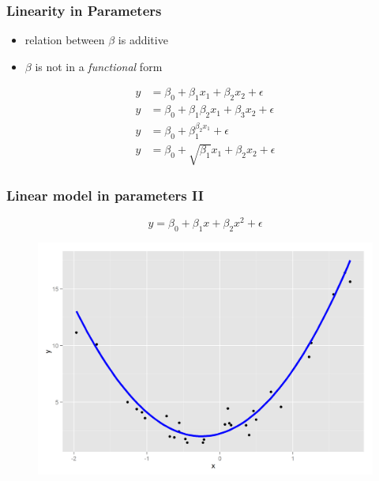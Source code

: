\documentclass[12pt]{beamer}\usepackage[]{graphicx}\usepackage[]{color}
\begin{document}

\begin{frame}
\frametitle{Linearity in Parameters}
\begin{Large}

 \begin{itemize}
	\item relation between $\beta$ is additive
	\item $\beta$ is not in a \emph{functional} form
 \end{itemize}
\begin{align}
y &= \beta_0 + \beta_1x_1 + \beta_2x_2 + \epsilon \\[0.4cm]
y &= \beta_0 + \beta_1\beta_2x_1 + \beta_3x_2 + \epsilon\\[0.4cm]
y &= \beta_0 + \beta_1^{\beta_2x_1} + \epsilon\\[0.4cm]
y &= \beta_0 + \sqrt{\beta_1}x_1 + \beta_2x_2 + \epsilon
\end{align}
\end{Large}
\end{frame}


\begin{frame}\large
\frametitle{Linear model in parameters II}
\begin{equation}
y = \beta_0 + \beta_1x + \beta_2x^2 + \epsilon
\end{equation}

\begin{figure}
 \includegraphics[width=0.7\paperwidth]{./Images/quadratic}
\end{figure}
\end{frame}
\end{document}
